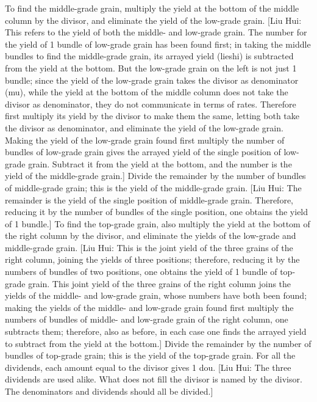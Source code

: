 \documentclass[11pt]{article}
\newenvironment{uniten}{\par\small\color{black!85}}{\par\medskip}
\begin{document}
\begin{uniten}To find the middle-grade grain, multiply the yield at the bottom of the middle column by the divisor, and eliminate the yield of the low-grade grain. [Liu Hui: This refers to the yield of both the middle- and low-grade grain. The number for the yield of 1 bundle of low-grade grain has been found first; in taking the middle bundles to find the middle-grade grain, its arrayed yield (lieshi) is subtracted from the yield at the bottom. But the low-grade grain on the left is not just 1 bundle; since the yield of the low-grade grain takes the divisor as denominator (mu), while the yield at the bottom of the middle column does not take the divisor as denominator, they do not communicate in terms of rates. Therefore first multiply its yield by the divisor to make them the same, letting both take the divisor as denominator, and eliminate the yield of the low-grade grain. Making the yield of the low-grade grain found first multiply the number of bundles of low-grade grain gives the arrayed yield of the single position of low-grade grain. Subtract it from the yield at the bottom, and the number is the yield of the middle-grade grain.] Divide the remainder by the number of bundles of middle-grade grain; this is the yield of the middle-grade grain. [Liu Hui: The remainder is the yield of the single position of middle-grade grain. Therefore, reducing it by the number of bundles of the single position, one obtains the yield of 1 bundle.] To find the top-grade grain, also multiply the yield at the bottom of the right column by the divisor, and eliminate the yields of the low-grade and middle-grade grain. [Liu Hui: This is the joint yield of the three grains of the right column, joining the yields of three positions; therefore, reducing it by the numbers of bundles of two positions, one obtains the yield of 1 bundle of top-grade grain. This joint yield of the three grains of the right column joins the yields of the middle- and low-grade grain, whose numbers have both been found; making the yields of the middle- and low-grade grain found first multiply the numbers of bundles of middle- and low-grade grain of the right column, one subtracts them; therefore, also as before, in each case one finds the arrayed yield to subtract from the yield at the bottom.] Divide the remainder by the number of bundles of top-grade grain; this is the yield of the top-grade grain. For all the dividends, each amount equal to the divisor gives 1 dou. [Liu Hui: The three dividends are used alike. What does not fill the divisor is named by the divisor. The denominators and dividends should all be divided.]\end{uniten}
\end{document}
